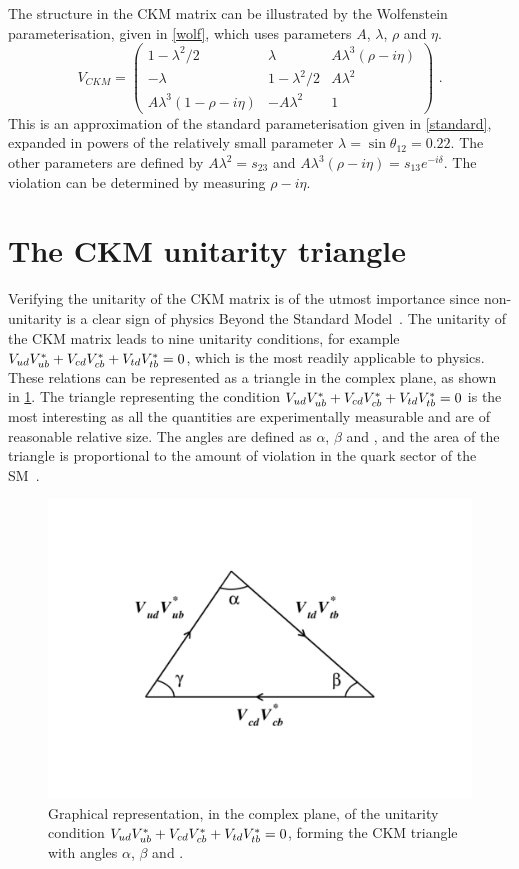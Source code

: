 The structure in the CKM matrix can be illustrated by the Wolfenstein parameterisation, given in \eqn\ref{wolf}, which uses parameters $A$, $\lambda$, $\rho$ and $\eta$. 
\begin{equation}
V_{CKM} = \begin{pmatrix} 1 - \lambda^2/2 & \lambda & A\lambda^3(\rho - i\eta) \\ 
-\lambda & 1 - \lambda^2/2 & A\lambda^2 \\ 
A\lambda^3(1 - \rho - i\eta) & -A\lambda^2 & 1 \end{pmatrix}
\label{wolf} \text{ .}
\end{equation} 
This is an approximation of the standard parameterisation given in \eqn\ref{standard}, expanded in powers of the relatively small parameter $\lambda = \sin\theta_{12} = 0.22$. The other parameters are defined by $A\lambda^2 = s_{23}$ and $A\lambda^3(\rho - i\eta) = s_{13}e^{-i\delta}$. The \CP violation can be determined by measuring $\rho - i\eta$.

\section{The CKM unitarity triangle}

Verifying the unitarity of the CKM matrix is of the utmost importance since non-unitarity is a clear sign of physics Beyond the Standard Model~\cite{CKMtriangle}. The unitarity of the CKM matrix leads to nine unitarity conditions, for example ${V_{{u}{d}}}{V_{{u}{b}}^\ast} + {V_{{c}{d}}}{V_{{c}{b}}^\ast} + {V_{{t}{d}}}{V_{{t}{b}}^\ast} = 0$, which is the most readily applicable to \B physics. These relations can be represented as a triangle in the complex plane, as shown in \fig\ref{triangle}. The triangle representing the condition ${V_{{u}{d}}}{V_{{u}{b}}^\ast} + {V_{{c}{d}}}{V_{{c}{b}}^\ast} + {V_{{t}{d}}}{V_{{t}{b}}^\ast} = 0$ is the most interesting as all the quantities are experimentally measurable and are of reasonable relative size. The angles are defined as $\alpha$, $\beta$ and \Pgamma, and the area of the triangle is proportional to the amount of \CP violation in the quark sector of the SM~\cite{CKMtriangle}. 
\begin{figure}
\centering
\includegraphics[trim = 50mm 50mm 50mm 50mm,clip,width=0.6\linewidth]{figures/theory/triangle.pdf}
\caption{Graphical representation, in the complex plane, of the unitarity condition ${V_{{u}{d}}}{V_{{u}{b}}^\ast} + {V_{{c}{d}}}{V_{{c}{b}}^\ast} + {V_{{t}{d}}}{V_{{t}{b}}^\ast} = 0$, forming the CKM triangle with angles $\alpha$, $\beta$ and \Pgamma.}
\label{triangle}
\end{figure}

